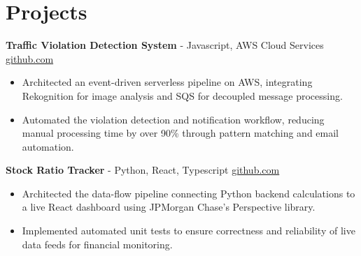 \documentclass[11pt]{article}       %
\begin{document}

\vspace{-18.5pt}

\section*{Projects}

\textbf{Traffic Violation Detection System}{ - Javascript, AWS Cloud Services} \hfill \href{https://github.com/Monica20030707/AWS_rekonigition-N-read-database}{github.com} \\
\vspace{-9pt}
\begin{itemize}
  \item Architected an event-driven serverless pipeline on AWS, integrating Rekognition for image analysis and SQS for decoupled message processing.
  \item Automated the violation detection and notification workflow, reducing manual processing time by over 90\% through pattern matching and email automation.
\end{itemize}

\textbf{Stock Ratio Tracker}{ - Python, React, Typescript} \hfill \href{https://github.com/Monica20030707/tradingDashboard-UI}{github.com} \\
\vspace{-9pt}
\begin{itemize}
  \item Architected the data-flow pipeline connecting Python backend calculations to a live React dashboard using JPMorgan Chase’s Perspective library.
  \item Implemented automated unit tests to ensure correctness and reliability of live data feeds for financial monitoring.
\end{itemize}
\end{document}
